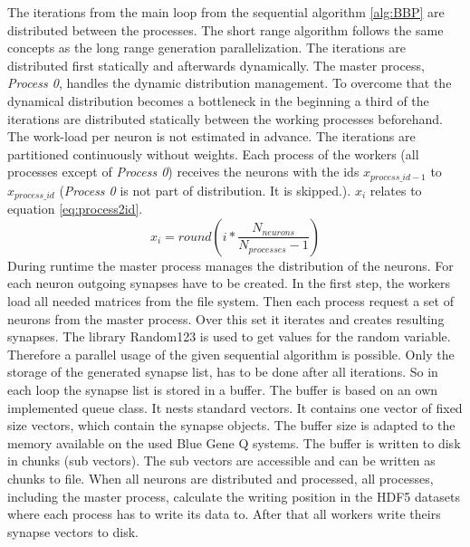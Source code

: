 The iterations from the main loop from the sequential algorithm \ref{alg:BBP} are distributed between the processes.
The short range algorithm follows the same concepts as the long range generation parallelization.
The iterations are distributed first statically and afterwards dynamically.
The master process, \emph{Process 0}, handles the dynamic distribution management.
To overcome that the dynamical distribution becomes a bottleneck in the beginning a third of the iterations are distributed
statically between the working processes beforehand.
The work-load per neuron is not estimated in advance.
The iterations are partitioned continuously without weights.
Each process of the workers (all processes except of \emph{Process 0}) receives the neurons with the ids $x_{process\_id-1}$
to $x_{process\_id}$ (\emph{Process 0} is not part of distribution. It is skipped.).
$x_i$ relates to equation \ref{eq:process2id}.
\begin{equation}
	x_i = round(i * \frac{N_{neurons}}{N_{processes}-1})
	\label{eq:process2id}
\end{equation}
During runtime the master process manages the distribution of the neurons. For each neuron 
outgoing synapses have to be created. In the first step, the workers load all needed matrices from the file system.
Then each process request a set of neurons from the master process. Over this set it iterates and creates resulting
synapses. The library Random123 is used to get values for the random variable. Therefore a parallel usage of 
the given sequential algorithm is possible. Only the storage of the generated synapse list, has to be done 
after all iterations. So in each loop the synapse list is stored in a buffer.
The buffer is based on an own implemented queue class. It nests standard vectors.
It contains one vector of fixed size vectors, which contain the synapse objects.
The buffer size is adapted to 
the memory available on the used Blue Gene Q systems.
The buffer is written to disk in chunks (sub vectors). The sub vectors are
accessible and can be written as chunks to file.
When all neurons are distributed and processed, all processes, including the master process, calculate the writing position
in the HDF5 datasets where each process has to write its data to. After that all workers write theirs synapse vectors to
disk.




